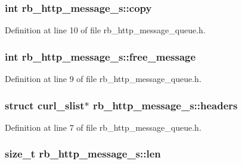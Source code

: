 \subsubsection[{copy}]{\setlength{\rightskip}{0pt plus 5cm}int rb\+\_\+http\+\_\+message\+\_\+s\+::copy}\label{structrb__http__message__s_aceda798a9af4f28a6dc89b273e6c348a}


Definition at line 10 of file rb\+\_\+http\+\_\+message\+\_\+queue.\+h.

\hypertarget{structrb__http__message__s_acbfdd79b7ec041a7b7e0edac1da72d30}{}
\subsubsection[{free\+\_\+message}]{\setlength{\rightskip}{0pt plus 5cm}int rb\+\_\+http\+\_\+message\+\_\+s\+::free\+\_\+message}\label{structrb__http__message__s_acbfdd79b7ec041a7b7e0edac1da72d30}


Definition at line 9 of file rb\+\_\+http\+\_\+message\+\_\+queue.\+h.

\hypertarget{structrb__http__message__s_ae12176a1bd60ed536eda95e2c530acc4}{}
\subsubsection[{headers}]{\setlength{\rightskip}{0pt plus 5cm}struct curl\+\_\+slist$\ast$ rb\+\_\+http\+\_\+message\+\_\+s\+::headers}\label{structrb__http__message__s_ae12176a1bd60ed536eda95e2c530acc4}


Definition at line 7 of file rb\+\_\+http\+\_\+message\+\_\+queue.\+h.

\hypertarget{structrb__http__message__s_a8c352ee939f1cd197bf009583e61552f}{}
\subsubsection[{len}]{\setlength{\rightskip}{0pt plus 5cm}size\+\_\+t rb\+\_\+http\+\_\+message\+\_\+s\+::len}\label{structrb__http__message__s_a8c352ee939f1cd197bf009583e61552f}


